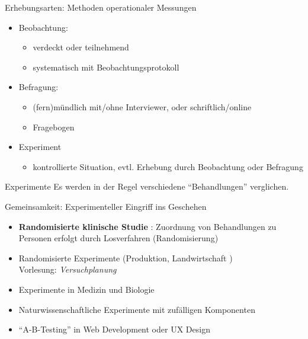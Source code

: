 \documentclass[
  10pt,
  ignorenonframetext,
]{beamer}
\providecommand{\tightlist}{%
  \setlength{\itemsep}{0pt}\setlength{\parskip}{0pt}}
\begin{document}
\begin{frame}{Erhebungsarten: Methoden operationaler Messungen}
\label{erhebungsarten-methoden-operationaler-messungen}
\begin{itemize}
\tightlist
\item
  Beobachtung:

  \begin{itemize}
  \tightlist
  \item
    verdeckt oder teilnehmend
  \item
    systematisch mit Beobachtungsprotokoll
  \end{itemize}
\item
  Befragung:

  \begin{itemize}
  \tightlist
  \item
    (fern)mündlich mit/ohne Interviewer, oder schriftlich/online
  \item
    Fragebogen
  \end{itemize}
\item
  Experiment

  \begin{itemize}
  \tightlist
  \item
    kontrollierte Situation, evtl. Erhebung durch Beobachtung oder
    Befragung
  \end{itemize}
\end{itemize}
\end{frame}

\begin{frame}{Experimente}
\label{experimente}
Es werden in der Regel verschiedene ``Behandlungen'' verglichen.

Gemeinsamkeit: Experimenteller Eingriff ins Geschehen

\begin{itemize}
\tightlist
\item
  \textbf{Randomisierte klinische Studie} : Zuordnung von Behandlungen
  zu Personen erfolgt durch Losverfahren (Randomisierung)
\item
  Randomisierte Experimente (Produktion, Landwirtschaft )\\
  Vorlesung: \emph{Versuchplanung}
\item
  Experimente in Medizin und Biologie
\item
  Naturwissenschaftliche Experimente mit zufälligen Komponenten
\item
  ``A-B-Testing'' in Web Development oder UX Design
\end{itemize}
\end{frame}
\end{document}
